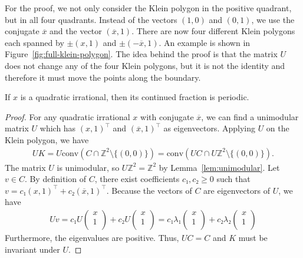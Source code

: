 For the proof, we not only consider the Klein polygon in the positive quadrant,
but in all four quadrants.
Instead of the vectors $(1, 0)$ and $(0, 1)$, we use the conjugate
$\overline{x}$ and the vector $(\overline{x}, 1)$.
There are now four different Klein polygons each spanned by $±(x, 1)$
and $±(-\overline{x}, 1)$.
An example is shown in Figure~\ref{fig:full-klein-polygon}.
The idea behind the proof is that the matrix $U$ does not change any of the four
Klein polygons, but it is not the identity and therefore it must move the
points along the boundary.

\begin{theorem}
  If $x$ is a quadratic irrational,
  then its continued fraction is periodic.
\end{theorem}

\begin{proof}
  For any quadratic irrational $x$ with conjugate $\overline{x}$, we can find a
  unimodular matrix $U$ which has $(x, 1)^⊤$ and $(\overline{x}, 1)^⊤$ as eigenvectors.
  Applying $U$ on the Klein polygon, we have
  \begin{align*}
    UK
    = U \mathrm{conv}(C ∩ ℤ^2 \setminus \{(0, 0)\})
    = \mathrm{conv}(UC ∩ Uℤ^2 \setminus \{(0, 0)\}).
  \end{align*}
  The matrix $U$ is unimodular, so $Uℤ^2 = ℤ^2$ by Lemma~\ref{lem:unimodular}.
  Let $v ∈ C$.
  By definition of $C$,
  there exist coefficients $c₁, c₂ ≥ 0$ such that $v = c₁ (x, 1)^⊤ + c₂ (\overline{x}, 1)^⊤$.
  Because the vectors of $C$ are eigenvectors of $U$, we have
  \begin{align*}
    U v
    = c₁
    U\begin{pmatrix}
      x \\
      1 \\
    \end{pmatrix}
    +
    c₂ U\begin{pmatrix}
      x \\
      1 \\
    \end{pmatrix}
    = c₁ λ₁ \begin{pmatrix}
      x \\
      1 \\
    \end{pmatrix}
    + c₂ λ₂ \begin{pmatrix}
      x \\
      1 \\
    \end{pmatrix}
  \end{align*}
  Furthermore, the eigenvalues are positive.
  Thus, $UC = C$ and $K$ must be invariant under $U$.


\end{proof}
